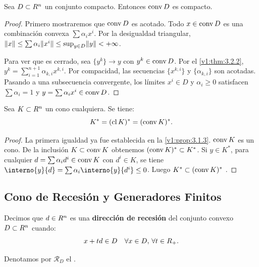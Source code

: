\begin{proposition}\label{v1:prop:3.2.5}
 Sea $D \subset R^n$ un conjunto compacto. Entonces $\operatorname{conv} D$ es compacto.
\end{proposition}

\begin{proof}
 Primero mostraremos que $\operatorname{conv} D$ es acotado. Todo $x \in \operatorname{conv} D$ es una combinación convexa $\sum \alpha_i x^i$. Por la desigualdad triangular, $\lVert x\rVert \leq \sum \alpha_i \lVert x^i\rVert \leq \sup_{y\in D} \lVert y\rVert < +\infty$.
 
 Para ver que es cerrado, sea $\{y^k\} \to y$ con $y^k \in \operatorname{conv} D$. Por el \cref{v1:thm:3.2.2}, $y^k = \sum_{i=1}^{n+1} \alpha_{k,i} x^{k,i}$. Por compacidad, las secuencias $\{x^{k,i}\}$ y $\{\alpha_{k,i}\}$ son acotadas. Pasando a una subsecuencia convergente, los límites $x^i \in D$ y $\alpha_i \ge 0$ satisfacen $\sum \alpha_i = 1$ y $y = \sum \alpha_i x^i \in \operatorname{conv} D$.
\end{proof}

\begin{proposition}\label{v1:prop:3.2.6}
 Sea $K \subset R^n$ un cono cualquiera. Se tiene:
 \[
 K^* = (\operatorname{cl} K)^* = (\operatorname{conv} K)^*.
 \]
\end{proposition}

\begin{proof}
 La primera igualdad ya fue establecida en la \cref{v1:prop:3.1.3}. $\operatorname{conv} K$ es un cono. De la inclusión $K \subset \operatorname{conv} K$ obtenemos $(\operatorname{conv} K)^* \subset K^*$. Si $y \in K^*$, para cualquier $d = \sum \alpha_i d^i \in \operatorname{conv} K$ con $d^i \in K$, se tiene $\interno{y}{d} = \sum \alpha_i \interno{y}{d^i} \leq 0$. Luego $K^* \subset (\operatorname{conv} K)^* $ .
\end{proof}

\subsection{Cono de Recesión y Generadores Finitos}

\begin{definition}\label{v1:def:3.2.3}
 Decimos que $d \in R^n$ es una \textbf{dirección de recesión} del conjunto convexo $D \subset R^n$ cuando:
 \[
 x + td \in D \quad \forall x \in D, \, \forall t \in R_+.
 \]
\end{definition}

Denotamos por $\mathcal{R}_D$ el .

